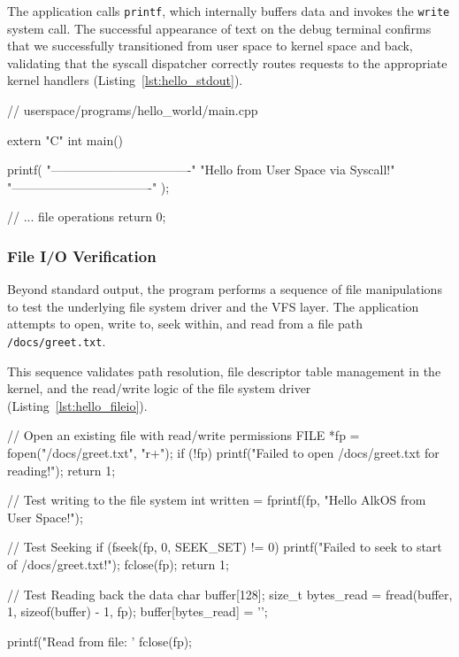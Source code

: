 \documentclass[a4paper,10pt,twoside]{report}
\theoremstyle{definition}
\begin{document}
The application calls \texttt{printf}, which internally buffers data and invokes the \texttt{write} system call. The successful appearance of text on the debug terminal confirms that we successfully transitioned from user space to kernel space and back, validating that the syscall dispatcher correctly routes requests to the appropriate kernel handlers (Listing~\ref{lst:hello_stdout}).

\begin{cppcode}[caption={Hello World Standard Output Test}, label={lst:hello_stdout}]
// userspace/programs/hello_world/main.cpp

extern "C" int main()
{
    printf(
        "\n----------------------------------\n"
        "Hello from User Space via Syscall!\n"
        "----------------------------------\n"
    );
    
    // ... file operations
    return 0;
}
\end{cppcode}

\subsubsection{File I/O Verification}

Beyond standard output, the program performs a sequence of file manipulations to test the underlying file system driver and the VFS layer. The application attempts to open, write to, seek within, and read from a file path \texttt{/docs/greet.txt}.

This sequence validates path resolution, file descriptor table management in the kernel, and the read/write logic of the file system driver (Listing~\ref{lst:hello_fileio}).

\clearpage

\begin{cppcode}[caption={File I/O Verification Logic}, label={lst:hello_fileio}]
    // Open an existing file with read/write permissions
    FILE *fp = fopen("/docs/greet.txt", "r+");
    if (!fp) {
        printf("Failed to open /docs/greet.txt for reading!\n");
        return 1;
    }

    // Test writing to the file system
    int written = fprintf(fp, "Hello AlkOS from User Space!");
    
    // Test Seeking
    if (fseek(fp, 0, SEEK_SET) != 0) {
        printf("Failed to seek to start of /docs/greet.txt!\n");
        fclose(fp);
        return 1;
    }

    // Test Reading back the data
    char buffer[128];
    size_t bytes_read = fread(buffer, 1, sizeof(buffer) - 1, fp);
    buffer[bytes_read] = '\0';

    printf("Read from file: '%
    fclose(fp);
\end{cppcode}
\end{document}
